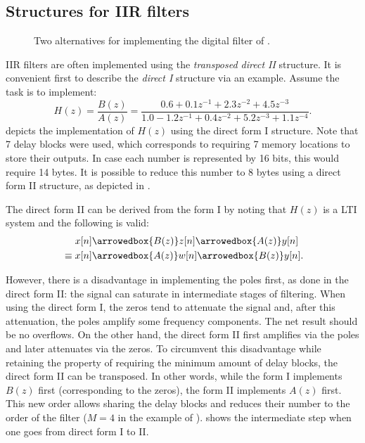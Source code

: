 \subsection{Structures for IIR filters}

\begin{figure}  
  \begin{center}
  \end{center}
  \caption{Two alternatives for implementing the digital filter of .}
  \label{fig:iir_realizations}
\end{figure}

IIR filters are often implemented using the \emph{transposed direct II} structure. It is convenient first to describe the \emph{direct I} structure via an example. Assume the task is to implement:
\begin{equation}
H(z) = \frac{B(z)}{A(z)} = \frac{0.6  + 0.1  z^{-1} + 2.3 z^{-2} + 4.5 z^{-3}}{1.0  -1.2 z^{-1}  + 0.4 z^{-2} + 5.2 z^{-3} + 1.1 z^{-4}}.
\label{eq:iir_example}
\end{equation}
 depicts the implementation of $H(z)$ using the direct form I structure. Note that 7 delay blocks were used, which corresponds to requiring 7 memory locations to store their outputs. In case each number is represented by 16 bits, this would require 14 bytes. It is possible to reduce this number to 8 bytes using a direct form II structure, as depicted in .

The direct form II can be derived from the form I by noting that $H(z)$ is a LTI system and the following is valid:
\begin{align*}
&\mathrel{\phantom{\equiv}} x[n] \arrowedbox{B(z)} z[n] \arrowedbox{A(z)}  y[n] \\
&\equiv  x[n] \arrowedbox{A(z)} w[n] \arrowedbox{B(z)}  y[n].
\end{align*}

However, there is a disadvantage in implementing the poles first, as done in the direct form II: the signal can saturate in intermediate stages of filtering. When using the direct form I, the zeros tend to attenuate the signal and, after this attenuation, the poles amplify some frequency components. The net result should be no overflows. On the other hand, the direct form II first amplifies via the poles and later attenuates via the zeros. To circumvent this disadvantage while retaining the property of requiring the minimum amount of delay blocks, the direct form II can be transposed.
In other words, while the form I implements $B(z)$ first (corresponding to the zeros), the form II implements $A(z)$ first. This new order allows sharing the delay blocks and reduces their number to the order of the filter ($M=4$ in the example of ).  shows the intermediate step when one goes from direct form I to II.

